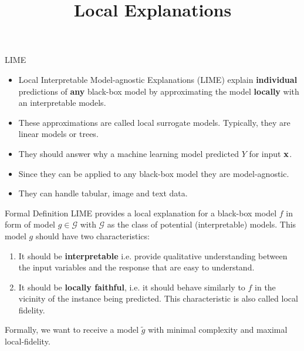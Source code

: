 \documentclass[11pt,compress,t,notes=noshow, xcolor=table]{beamer}
\title{Local Explanations}
\institute{\href{https://compstat-lmu.github.io/lecture_i2ml/}{compstat-lmu.github.io/lecture\_i2ml}}
\date{}
\newcommand{\Gspace}{\mathcal{G}}
\begin{document}
	
	
	
	
	
	
	
	
	

\begin{vbframe}{LIME}
\begin{itemize}
		\item  Local Interpretable Model-agnostic Explanations (LIME) explain \textbf{individual} predictions of \textbf{any} black-box model by approximating the model \textbf{locally} with an interpretable models.
		\item These approximations are called local surrogate models. Typically, they are linear models or trees.
		\item They should answer why a machine learning model predicted $Y$ for input $\xv$.
		\item Since they can be applied to any black-box model they are model-agnostic.  
		\item They can handle tabular, image and text data. 
\end{itemize}
\end{vbframe}

\begin{vbframe}{Formal Definition}
	LIME provides a local explanation for a black-box model $f$ in form of model $g \in \Gspace$ with $\Gspace$ as the class of potential (interpretable) models. This model $g$ should have two characteristics:
	\begin{enumerate}
		\item It should be \textbf{interpretable} i.e. provide qualitative understanding between the input variables and the response that are easy to understand.  
		\item It should be \textbf{locally faithful}, i.e. it should behave similarly to $f$ in the vicinity of the instance being predicted. This characteristic is also called local fidelity. 
	\end{enumerate}
	Formally, we want to receive a model $\tilde{g}$ with minimal complexity and maximal local-fidelity. 
\end{vbframe}
\end{document}
